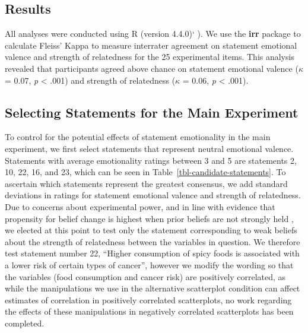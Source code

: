 \documentclass[sigconf]{acmart}
\begin{document}
\subsection{Results}\label{sec-results-pre}

All analyses were conducted using R (version 4.4.0)` \citep{rcore}). We
use the \textbf{irr} package to calculate Fleiss' Kappa to measure
interrater agreement on statement emotional valence and strength of
relatedness for the 25 experimental items. This analysis revealed that
participants agreed above chance on statement emotional valence
(\(\kappa\) = 0.07, \emph{p} \textless{} .001) and strength of
relatedness (\(\kappa\) = 0.06, \emph{p} \textless{} .001).

\subsection{Selecting Statements for the Main
Experiment}\label{sec-selecting-statements}

To control for the potential effects of statement emotionality in the
main experiment, we first select statements that represent neutral
emotional valence. Statements with average emotionality ratings between
3 and 5 are statements 2, 10, 22, 16, and 23, which can be seen in
Table~\ref{tbl-candidate-statements}. To ascertain which statements
represent the greatest consensus, we add standard deviations in ratings
for statement emotional valence and strength of relatedness. Due to
concerns about experimental power, and in line with evidence that
propensity for belief change is highest when prior beliefs are not
strongly held \citep{xiong_2022, markant_2023}, we elected at this point
to test only the statement corresponding to weak beliefs about the
strength of relatedness between the variables in question. We therefore
test statement number 22, ``Higher consumption of spicy foods is
associated with a lower risk of certain types of cancer'', however we
modify the wording so that the variables (food consumption and cancer
risk) are positively correlated, as while the manipulations we use in
the alternative scatterplot condition can affect estimates of
correlation in positively correlated scatterplots, no work regarding the
effects of these manipulations in negatively correlated scatterplots has
been completed.
\end{document}
